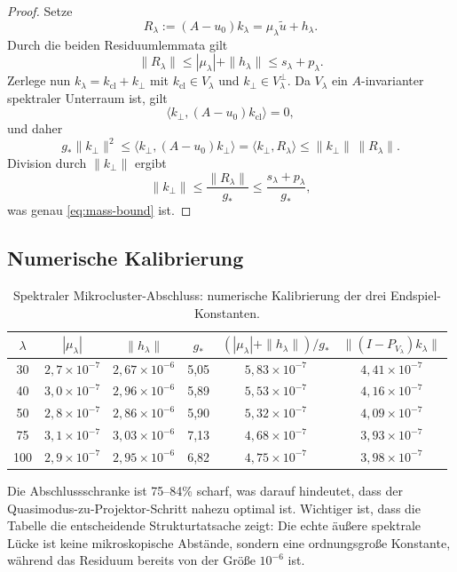 \documentclass[12pt,a4paper]{article}
\theoremstyle{definition}
\theoremstyle{remark}
\newcommand{\ip}[2]{\langle #1, #2 \rangle}
\newcommand{\norm}[1]{\| #1 \|}
\newcommand{\utilde}{\tilde{u}}
\begin{document}
\begin{proof}
Setze
\[
  R_\lambda := (A-u_0)k_\lambda = \mu_\lambda \utilde + h_\lambda.
\]
Durch die beiden Residuumlemmata gilt
\[
  \norm{R_\lambda}
  \le |\mu_\lambda| + \norm{h_\lambda}
  \le s_\lambda + p_\lambda.
\]
Zerlege nun $k_\lambda = k_{\mathrm{cl}} + k_\perp$ mit
$k_{\mathrm{cl}} \in V_\lambda$ und $k_\perp \in V_\lambda^\perp$.
Da $V_\lambda$ ein $A$-invarianter spektraler Unterraum ist, gilt
\[
  \ip{k_\perp}{(A-u_0)k_{\mathrm{cl}}} = 0,
\]
und daher
\[
  g_* \norm{k_\perp}^2
  \le
  \ip{k_\perp}{(A-u_0)k_\perp}
  =
  \ip{k_\perp}{R_\lambda}
  \le
  \norm{k_\perp}\,\norm{R_\lambda}.
\]
Division durch $\norm{k_\perp}$ ergibt
\[
  \norm{k_\perp}
  \le
  \frac{\norm{R_\lambda}}{g_*}
  \le
  \frac{s_\lambda+p_\lambda}{g_*},
\]
was genau \eqref{eq:mass-bound} ist.
\end{proof}

\subsection{Numerische Kalibrierung}

\begin{table}[h]
\centering
\caption{Spektraler Mikrocluster-Abschluss: numerische Kalibrierung der
drei Endspiel-Konstanten.}
\label{tab:endgame}
\begin{tabular}{cccccc}
\toprule
$\lambda$ & $|\mu_\lambda|$ & $\norm{h_\lambda}$ & $g_*$ &
  $(|\mu_\lambda|+\norm{h_\lambda})/g_*$ &
  $\norm{(I-P_{V_\lambda})k_\lambda}$ \\
\midrule
30 & $2{,}7 \times 10^{-7}$ & $2{,}67 \times 10^{-6}$ & 5,05 & $5{,}83 \times 10^{-7}$ &
  $4{,}41 \times 10^{-7}$ \\
40 & $3{,}0 \times 10^{-7}$ & $2{,}96 \times 10^{-6}$ & 5,89 & $5{,}53 \times 10^{-7}$ &
  $4{,}16 \times 10^{-7}$ \\
50 & $2{,}8 \times 10^{-7}$ & $2{,}86 \times 10^{-6}$ & 5,90 & $5{,}32 \times 10^{-7}$ &
  $4{,}09 \times 10^{-7}$ \\
75 & $3{,}1 \times 10^{-7}$ & $3{,}03 \times 10^{-6}$ & 7,13 & $4{,}68 \times 10^{-7}$ &
  $3{,}93 \times 10^{-7}$ \\
100 & $2{,}9 \times 10^{-7}$ & $2{,}95 \times 10^{-6}$ & 6,82 & $4{,}75 \times 10^{-7}$ &
  $3{,}98 \times 10^{-7}$ \\
\bottomrule
\end{tabular}
\end{table}

Die Abschlussschranke ist 75--84\% scharf, was darauf hindeutet, dass der
Quasimodus-zu-Projektor-Schritt nahezu optimal ist. Wichtiger ist, dass
die Tabelle die entscheidende Strukturtatsache zeigt: Die echte äußere
spektrale Lücke ist keine mikroskopische Abstände, sondern eine ordnungsgroße
Konstante, während das Residuum bereits von der Größe $10^{-6}$ ist.
\end{document}
